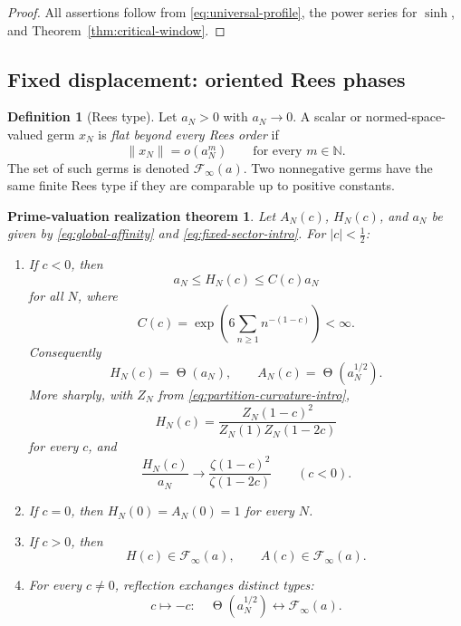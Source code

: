 \documentclass[11pt]{article}
\newtheorem*{maintheorem}{Prime-valuation realization theorem}
\theoremstyle{definition}
\newtheorem{definition}[theorem]{Definition}
\theoremstyle{remark}
\newcommand{\N}{\mathbb N}
\newcommand{\cF}{\mathcal F}
\newcommand{\Thetaas}{\mathop{\Theta}}
\begin{document}
\begin{proof}
All assertions follow from \eqref{eq:universal-profile}, the power series for \(\sinh\), and
Theorem~\ref{thm:critical-window}.
\end{proof}

\subsection{Fixed displacement: oriented Rees phases}

\begin{definition}[Rees type]\label{def:rees-type}
Let \(a_N>0\) with \(a_N\to0\).  A scalar or normed-space-valued germ \(x_N\) is
\emph{flat beyond every Rees order} if
\[
 \|x_N\|=o(a_N^m)
 \qquad\text{for every }m\in\N.
 \tag{3.8}\label{eq:all-orders-flat}
\]
The set of such germs is denoted \(\cF_\infty(a)\).  Two nonnegative germs have the
same finite Rees type if they are comparable up to positive constants.
\end{definition}

\begin{maintheorem}\label{thm:main}
Let \(A_N(c)\), \(H_N(c)\), and \(a_N\) be given by
\eqref{eq:global-affinity} and \eqref{eq:fixed-sector-intro}.  For \(|c|<\tfrac12\):
\begin{enumerate}[label=\textup{(\roman*)}]
\item If \(c<0\), then
\[
 a_N\leq H_N(c)\leq C(c)a_N
 \tag{3.9}\label{eq:negative-comparison}
\]
for all \(N\), where
\[
 C(c)=\exp\!\left(6\sum_{n\geq1}n^{-(1-c)}\right)<\infty.
 \tag{3.10}\label{eq:correction-constant}
\]
Consequently
\[
 H_N(c)=\Thetaas(a_N),\qquad
 A_N(c)=\Thetaas(a_N^{1/2}).
 \tag{3.11}\label{eq:negative-half-normal}
\]
More sharply, with \(Z_N\) from \eqref{eq:partition-curvature-intro},
\[
 H_N(c)=
 \frac{Z_N(1-c)^2}{Z_N(1)Z_N(1-2c)}
 \tag{3.12}\label{eq:exact-euler-hellinger}
\]
for every \(c\), and
\[
 \frac{H_N(c)}{a_N}\longrightarrow
 \frac{\zeta(1-c)^2}{\zeta(1-2c)}
 \qquad(c<0).
 \tag{3.13}\label{eq:exact-negative-limit}
\]
\item If \(c=0\), then \(H_N(0)=A_N(0)=1\) for every \(N\).
\item If \(c>0\), then
\[
 H(c)\in\cF_\infty(a),\qquad A(c)\in\cF_\infty(a).
 \tag{3.14}\label{eq:positive-flat}
\]
\item For every \(c\neq0\), reflection exchanges distinct types:
\[
 c\mapsto-c:
 \quad
 \Thetaas(a_N^{1/2})
 \longleftrightarrow
 \cF_\infty(a).
 \tag{3.15}\label{eq:type-fracture}
\]
\end{enumerate}
\end{maintheorem}
\end{document}
